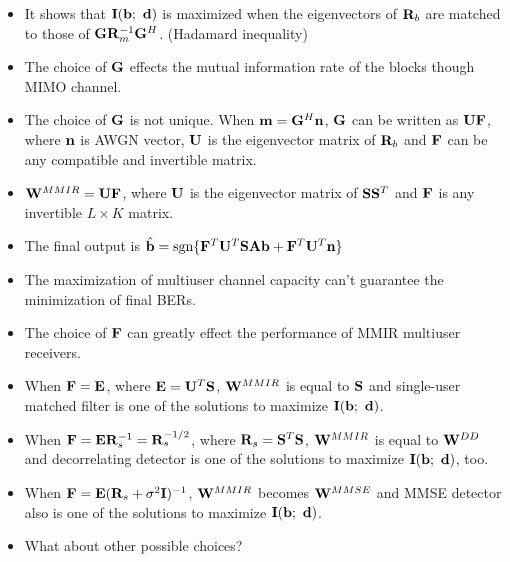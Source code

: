 \documentclass[20pt,landscape]{foils}
\newcommand{\bA}{{\mathbf A}}
\newcommand{\bb}{{\bf b}}
\newcommand{\bd}{{\bf d}}
\newcommand{\bbm}{{\bf m}}
\newcommand{\bn}{{\bf n}}
\newcommand{\bE}{{\bf E}}
\newcommand{\bF}{{\bf F}}
\newcommand{\bG}{{\bf G}}
\newcommand{\bS}{{\bf S}}
\newcommand{\bI}{{\bf I}}
\newcommand{\bR}{{\bf R}}
\newcommand{\bU}{{\bf U}}
\newcommand{\bW}{{\bf W}}
\begin{document}

\begin{itemize}

\item It shows that $\bI(\bb;\ \bd)$ is maximized when the
eigenvectors of $\bR_b$ are matched to those of
$\bG\bR_m^{-1}\bG^H$. (Hadamard inequality)

\item The choice of $\bG$ effects the mutual information rate of
the blocks though MIMO channel.

\item The choice of $\bG$ is not unique. When $\bbm=\bG^H\bn$,
$\bG$ can be written as $\bU\bF$, where $\bn$ is AWGN vector,
$\bU$ is the eigenvector matrix of $\bR_b$ and $\bF$ can be any
compatible and invertible matrix.
\end{itemize}


\begin{itemize}

\item $\bW^{MMIR}=\bU\bF$, where $\bU$ is the eigenvector matrix
of $\bS\bS^T$ and $\bF$ is any invertible $L\times K$ matrix.

\item The final output is
$\hat{\bb}=\mbox{sgn}\{\bF^T\bU^T\bS\bA\bb+\bF^T\bU^T\bn\}$ \item
The maximization of multiuser channel capacity can't guarantee the
minimization of final BERs.

\item The choice of $\bF$ can greatly effect the performance of
MMIR multiuser receivers.
\end{itemize}

\foilhead{\LARGE The Choice of $\bF$}

\begin{itemize}
\item When $\bF=\bE$, where $\bE=\bU^T\bS$, $\bW^{MMIR}$ is equal
to $\bS$ and single-user matched filter is one of the solutions to
maximize $\bI(\bb;\ \bd)$.

\item When $\bF=\bE\bR_s^{-1}=\bR_s^{-1/2}$, where
$\bR_s=\bS^T\bS$, $\bW^{MMIR}$ is equal to $\bW^{DD}$ and
decorrelating detector is one of the solutions to maximize
$\bI(\bb;\ \bd)$, too.

\item When $\bF=\bE(\bR_s+\sigma^2\bI)^{-1}$, $\bW^{MMIR}$ becomes
$\bW^{MMSE}$ and MMSE detector also is one of the solutions to
maximize $\bI(\bb;\ \bd)$.

\item What about other possible choices?
\end{itemize}
\end{document}
